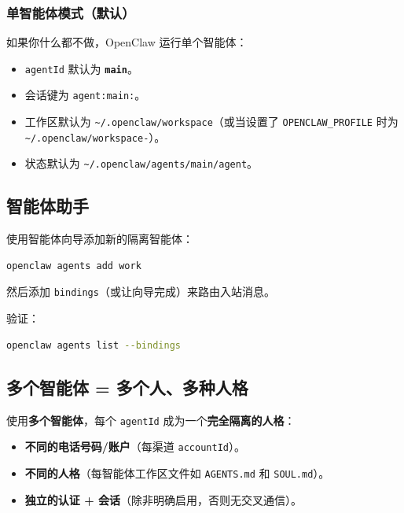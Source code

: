 \subsubsection{单智能体模式（默认）}


如果你什么都不做，OpenClaw 运行单个智能体：

\begin{itemize}
  \item \texttt{agentId} 默认为 \textbf{\texttt{main}}。
  \item 会话键为 \texttt{agent:main:}。
  \item 工作区默认为 \texttt{\textasciitilde{}/.openclaw/workspace}（或当设置了 \texttt{OPENCLAW\_PROFILE} 时为 \texttt{\textasciitilde{}/.openclaw/workspace-}）。
  \item 状态默认为 \texttt{\textasciitilde{}/.openclaw/agents/main/agent}。
\end{itemize}


\subsection{智能体助手}


使用智能体向导添加新的隔离智能体：

\begin{lstlisting}[language=bash]
openclaw agents add work
\end{lstlisting}


然后添加 \texttt{bindings}（或让向导完成）来路由入站消息。

验证：

\begin{lstlisting}[language=bash]
openclaw agents list --bindings
\end{lstlisting}


\subsection{多个智能体 = 多个人、多种人格}


使用\textbf{多个智能体}，每个 \texttt{agentId} 成为一个\textbf{完全隔离的人格}：

\begin{itemize}
  \item \textbf{不同的电话号码/账户}（每渠道 \texttt{accountId}）。
  \item \textbf{不同的人格}（每智能体工作区文件如 \texttt{AGENTS.md} 和 \texttt{SOUL.md}）。
  \item \textbf{独立的认证 + 会话}（除非明确启用，否则无交叉通信）。
\end{itemize}


